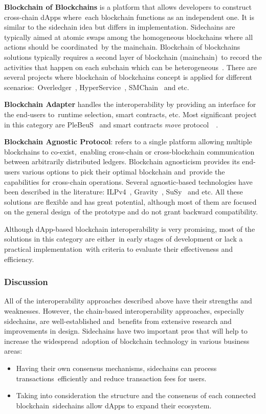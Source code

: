 \textbf{Blockchain of Blockchains} is a platform that allows developers to construct cross-chain dApps where\
each blockchain functions as an independent one.
It is similar to the sidechain idea but differs in implementation.
Sidechains are typically aimed at atomic swaps among the homogeneous blockchains where all actions should be coordinated\
by the mainchain.
Blockchain of blockchains solutions typically requires a second layer of blockchain (mainchain)\
to record the activities that happen on each subchain which can be heterogeneous~\cite{cryptoeprint:2021/537}.
There are several projects where blockchain of blockchains concept is applied for different scenarios:\
Overledger~\cite{Verdian2018}, HyperService~\cite{Liu2019}, SMChain~\cite{cryptoeprint:2019/1401} and etc.

\textbf{Blockchain Adapter} handles the interoperability by providing an interface for the end-users to\
runtime selection, smart contracts, etc.
Most significant project in this category are PleBeuS~\cite{Scheid2020} and smart contracts \emph{move} protocol\
~\cite{Fynn2020}.

\textbf{Blockchain Agnostic Protocol}: refers to a single platform allowing multiple blockchains to co-exist,\
enabling cross-chain or cross-blockchain communication between arbitrarily distributed ledgers.
Blockchain agnosticism provides its end-users various options to pick their optimal blockchain and\
provide the capabilities for cross-chain operations.
Several agnostic-based technologies have been described in the literature: ILPv4~\cite{InterledgerV4},
Gravity~\cite{PupyshevGravity2020}, SuSy~\cite{PupyshevSuSy2020} and etc.
All these solutions are flexible and has great potential, although most of them are focused on the general design\
of the prototype and do not grant backward compatibility.

Although dApp-based blockchain interoperability is very promising, most of the solutions in this category are either\
in early stages of development or lack a practical implementation\
with criteria to evaluate their effectiveness and efficiency.

\subsubsection{Discussion}

All of the interoperability approaches described above have their strengths and weaknesses.
However, the chain-based interoperability approaches, especially sidechains, are well-established and\
benefits from extensive research and improvements in design.
Sidechains have two important pros that will help to increase the widespread\
adoption of blockchain technology in various business areas:
\begin{itemize}
    \item Having their own consensus mechanisms, sidechains can process transactions\
    efficiently and reduce transaction fees for users.
    \item Taking into consideration the structure and the consensus of each connected blockchain\
    sidechains allow dApps to expand their ecosystem.
\end{itemize}

